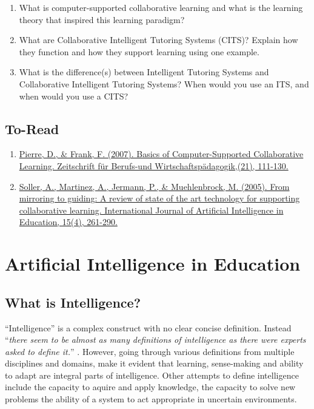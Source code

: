 \documentclass[
]{book}
\providecommand{\tightlist}{%
  \setlength{\itemsep}{0pt}\setlength{\parskip}{0pt}}
\begin{document}
\begin{enumerate}
\def\labelenumi{\arabic{enumi}.}
\tightlist
\item
  What is computer-supported collaborative learning and what is the learning theory that inspired this learning paradigm?
\item
  What are Collaborative Intelligent Tutoring Systems (CITS)? Explain how they function and how they support learning using one example.
\item
  What is the difference(s) between Intelligent Tutoring Systems and Collaborative Intelligent Tutoring Systems? When would you use an ITS, and when would you use a CITS?
\end{enumerate}

\section{To-Read}\label{to-read-3}

\begin{enumerate}
\def\labelenumi{\arabic{enumi}.}
\tightlist
\item
  \href{https://www.researchgate.net/publication/37452559_Basics_of_Computer-Supported_Collaborative_Learning}{Pierre, D., \& Frank, F. (2007). Basics of Computer-Supported Collaborative Learning. Zeitschrift für Berufs-und Wirtschaftspädagogik,(21), 111-130.}
\item
  \href{https://telearn.hal.science/file/index/docid/197378/filename/Soller-Amy-2005.pdf}{Soller, A., Martinez, A., Jermann, P., \& Muehlenbrock, M. (2005). From mirroring to guiding: A review of state of the art technology for supporting collaborative learning. International Journal of Artificial Intelligence in Education, 15(4), 261-290.}
\end{enumerate}

\chapter{Artificial Intelligence in Education}\label{aied}

\section{What is Intelligence?}\label{what-is-intelligence}

``Intelligence'' is a complex construct with no clear concise definition. Instead ``\emph{there seem to be almost as many definitions of intelligence as there were experts asked to define it.}'' \citep{legg2007collection}. However, going through various definitions from multiple disciplines and domains, make it evident that learning, sense-making and ability to adapt are integral parts of intelligence. Other attempts to define intelligence include the capacity to aquire and apply knowledge, the capacity to solve new problems the ability of a system to act appropriate in uncertain environments.
\end{document}
